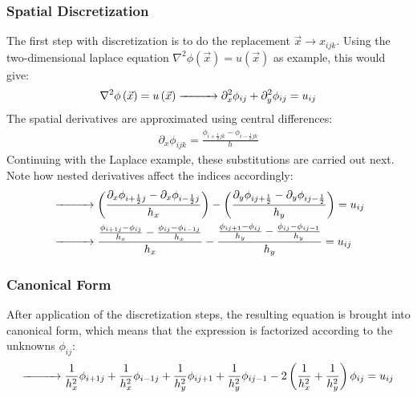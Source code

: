 \subsubsection*{Spatial Discretization}
The first step with discretization is to do the replacement $\vec{x}\rightarrow x_{ijk}$. Using the two-dimensional laplace equation $\nabla^2\phi(\vec{x})=u(\vec{x})$ as example, this would give:
\begin{align*}
\nabla^2\phi\left(\vec{x}\right)=u\left(\vec{x}\right)
\xrightarrow{\makebox[1cm]{}}
\partial_x^2\phi_{ij}+
\partial_y^2\phi_{ij}
=
u_{ij}
\end{align*}
The spatial derivatives are approximated using central differences:
\begin{align}
\partial_x\phi_{ijk} = \frac{\phi_{i+\frac{1}{2}jk} - \phi_{i-\frac{1}{2}jk}}{h}
\label{eq:pn_solver_central_difference}
\end{align}
Continuing with the Laplace example, these substitutions are carried out next. Note how nested derivatives affect the indices accordingly:
\begin{align*}
&
\xrightarrow{\makebox[1cm]{}}
\left(
\frac
{
\partial_x
\phi_{i+\frac{1}{2}j}
-
\partial_x
\phi_{i-\frac{1}{2}j}
}
{h_x}
\right)
-
\left(
\frac
{
\partial_y
\phi_{ij+\frac{1}{2}}
-
\partial_y
\phi_{ij-\frac{1}{2}}
}
{h_y}
\right)
=
u_{ij}
\\
&
\xrightarrow{\makebox[1cm]{}}
\frac
{
\frac{\phi_{i+1j} - \phi_{ij}}{h_x}
-
\frac{\phi_{ij} - \phi_{i-1j}}{h_x}
}
{h_x}
-
\frac
{
\frac{\phi_{ij+1} - \phi_{ij}}{h_y}
-
\frac{\phi_{ij} - \phi_{ij-1}}{h_y}
}
{h_y}
=
u_{ij}
\end{align*}

\subsubsection*{Canonical Form}
After application of the discretization steps, the resulting equation is brought into canonical form, which means that the expression is factorized according to the unknowns $\phi_{ij}$:
\begin{align*}
\xrightarrow{\makebox[1cm]{}}
\frac{1}{h_x^2}\phi_{i+1j}
+\frac{1}{h_x^2}\phi_{i-1j}
+\frac{1}{h_y^2}\phi_{ij+1}
+\frac{1}{h_y^2}\phi_{ij-1}
-2\left(\frac{1}{h_x^2}+\frac{1}{h_y^2}\right)\phi_{ij}
=
u_{ij}
\end{align*}
